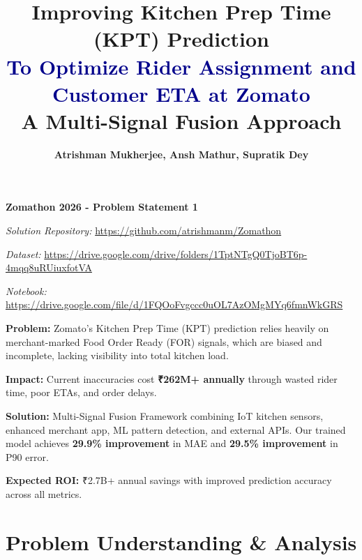 \documentclass[11pt,a4paper]{article}
\title{
    \vspace{-1cm}
    \Huge\textbf{\textcolor{zomato}{Improving Kitchen Prep Time (KPT) Prediction}} \\
    \LARGE\textcolor{darkblue}{To Optimize Rider Assignment and Customer ETA at Zomato} \\
    \vspace{0.5cm}
    \large A Multi-Signal Fusion Approach
}
\author{\textbf{Atrishman Mukherjee, Ansh Mathur, Supratik Dey}}
\date{}
\begin{document}
\maketitle
\thispagestyle{empty}

\begin{center}
\large
\textbf{Zomathon 2026 - Problem Statement 1}

\vspace{0.5cm}

\textit{Solution Repository:} \url{https://github.com/atrishmanm/Zomathon}

\textit{Dataset:} \url{https://drive.google.com/drive/folders/1TptNTgQ0TjoBT6p-4mqq8uRUiuxfotVA}

\textit{Notebook:} \url{https://drive.google.com/file/d/1FQOoFvgccc0uOL7AzOMgMYq6fmnWkGRS}
\end{center}

\vspace{1cm}

\begin{tcolorbox}[colback=lightgray,colframe=zomato,title=\textbf{Executive Summary}]
\textbf{Problem:} Zomato's Kitchen Prep Time (KPT) prediction relies heavily on merchant-marked Food Order Ready (FOR) signals, which are biased and incomplete, lacking visibility into total kitchen load.

\vspace{0.3cm}

\textbf{Impact:} Current inaccuracies cost \textbf{₹262M+ annually} through wasted rider time, poor ETAs, and order delays.

\vspace{0.3cm}

\textbf{Solution:} Multi-Signal Fusion Framework combining IoT kitchen sensors, enhanced merchant app, ML pattern detection, and external APIs. Our trained model achieves \textbf{29.9\% improvement} in MAE and \textbf{29.5\% improvement} in P90 error.

\vspace{0.3cm}

\textbf{Expected ROI:} ₹2.7B+ annual savings with improved prediction accuracy across all metrics.
\end{tcolorbox}

\vspace{0.5cm}

\tableofcontents

\newpage

\section{Problem Understanding \& Analysis}
\end{document}
